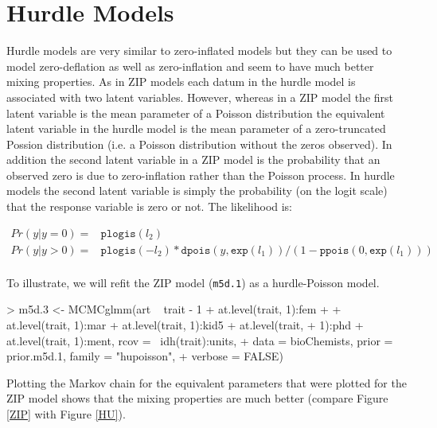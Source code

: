 \documentclass{article}
\begin{document}
\section{Hurdle Models}
\label{Hurdle}

Hurdle models are very similar to zero-inflated models but they can be used to model zero-deflation as well as zero-inflation and seem to have much better mixing properties.  As in ZIP models each datum in the hurdle model is associated with two latent variables. However, whereas in a ZIP model the first latent variable is the mean parameter of a Poisson distribution the equivalent latent variable in the hurdle model is the mean parameter of a zero-truncated Possion distribution (i.e. a Poisson distribution without the zeros  observed). In addition the second latent variable in a ZIP model is the probability that an observed zero is due to zero-inflation rather than the Poisson process. In hurdle models the second latent variable is simply the probability (on the logit scale) that the response variable is zero or not. The likelihood is:

\begin{equation} 
\begin{array}{rl}
Pr(y | y=0) =& \texttt{plogis}(l_{2})\\
Pr(y | y>0) =& \texttt{plogis}(-l_{2})\ast \texttt{dpois}(y, \texttt{exp}(l_{1}))/(1-\texttt{ppois}(0, \texttt{exp}(l_{1})))\\
\end{array}
\end{equation}

 To illustrate, we will refit the ZIP model (\texttt{m5d.1}) as a hurdle-Poisson model.

\begin{Schunk}
\begin{Sinput}
> m5d.3 <- MCMCglmm(art ~ trait - 1 + at.level(trait, 1):fem + 
+     at.level(trait, 1):mar + at.level(trait, 1):kid5 + at.level(trait, 
+     1):phd + at.level(trait, 1):ment, rcov = ~idh(trait):units, 
+     data = bioChemists, prior = prior.m5d.1, family = "hupoisson", 
+     verbose = FALSE)
\end{Sinput}
\end{Schunk}

Plotting the Markov chain for the equivalent parameters that were plotted for the ZIP model shows that the mixing properties are much better (compare Figure \ref{ZIP} with Figure \ref{HU}).
\end{document}
